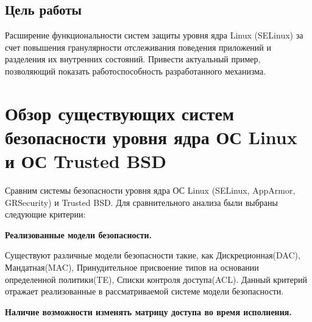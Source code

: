 \subsection{Цель работы} 
Расширение функциональности систем защиты 
уровня ядра Linux (SELinux) за счет повышения 
гранулярности отслеживания поведения приложений 
и разделения их внутренних состояний. Привести
актуальный пример, позволяющий показать работоспособность 
разработанного механизма.

\begin{comment}
\subsection{Постановка задачи}
В рамках работы должны быть решены следующие задачи:
\begin{itemize}
\item Сравнительный анализ систем безопасности 
	уровня ядра ОС Linux.
\item Исследование возможности 
	простановки контрольных точек на уровне 
	исходных текстов и бинарных программ.
\item Разработка программной инфраструктуры 
	поддержки контроля состояния приложения 
	по контрольным точкам для ОС GNU/Linux.
\item Расширение профилей SELinux, добавление 
	возможности переключения контекста безопасности 
	при изменении состояния приложения.
\end{itemize}
\bigskip

\end{comment}

\section{Обзор существующих систем безопасности 
	уровня ядра ОС Linux и ОС Trusted BSD}

\bigskip
Сравним системы безопасности уровня ядра ОС Linux
(SELinux, AppArmor, GRSecurity) и Trusted BSD. 
Для сравнительного анализа были выбраны следующие 
критерии:
 
\bigskip
{\bfseries Реализованные модели безопасности.} 

	Существуют различные модели безопасности такие, 
	как Дискреционная(DAC), Мандатная(MAC), Принудительное 
	присвоение типов на основании определенной 
	политики(TE), Списки контроля доступа(ACL). 
	Данный критерий отражает реализованные 
	в рассматриваемой системе модели безопасности.  

\bigskip
{\bfseries Наличие возможности изменять матрицу доступа 
	во время исполнения.}
	
